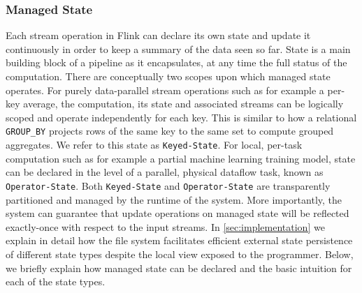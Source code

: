 \subsubsection{Managed State}
\label{sec:managedstate}
Each stream operation in Flink can declare its own state and update it continuously in order to keep a summary of the data seen so far. State is a main building block of a pipeline as it encapsulates, at any time the full status of the computation. There are conceptually two scopes upon which managed state operates. For purely data-parallel stream operations such as for example a per-key average, the computation, its state and associated streams can be logically scoped and operate independently for each key. This is similar to how a relational \texttt{GROUP\_BY} projects rows of the same key to the same set to compute grouped aggregates. We refer to this state as \texttt{Keyed-State}.
For local, per-task computation such as for example a partial machine learning training model, state can be declared in the level of a parallel, physical dataflow task, known as \texttt{Operator-State}. Both \texttt{Keyed-State} and \texttt{Operator-State} are transparently partitioned and managed by the runtime of the system. More importantly, the system can guarantee that update operations on managed state will be reflected exactly-once with respect to the input streams. In \autoref{sec:implementation} we explain in detail how the file system facilitates efficient external state persistence of different state types despite the local view exposed to the programmer. Below, we briefly explain how managed state can be declared and the basic intuition for each of the state types. 


